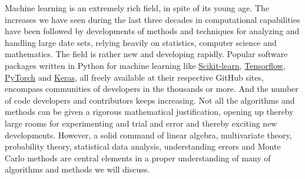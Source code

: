 \documentclass{beamer}
\begin{document}
\begin{frame}
Machine learning is an extremely rich field, in spite of its young
age. The increases we have seen during the last three decades in
computational capabilities have been followed by developments of
methods and techniques for analyzing and handling large date sets,
relying heavily on statistics, computer science and mathematics.  The
field is rather new and developing rapidly. Popular software packages
written in Python for machine learning like
\href{{http://scikit-learn.org/stable/}}{Scikit-learn},
\href{{https://www.tensorflow.org/}}{Tensorflow},
\href{{http://pytorch.org/}}{PyTorch} and \href{{https://keras.io/}}{Keras}, all
freely available at their respective GitHub sites, encompass
communities of developers in the thousands or more. And the number of
code developers and contributors keeps increasing. Not all the
algorithms and methods can be given a rigorous mathematical
justification, opening up thereby large rooms for experimenting and
trial and error and thereby exciting new developments.  However, a
solid command of linear algebra, multivariate theory, probability
theory, statistical data analysis, understanding errors and Monte
Carlo methods are central elements in a proper understanding of many
of algorithms and methods we will discuss.
\end{frame}
\end{document}
